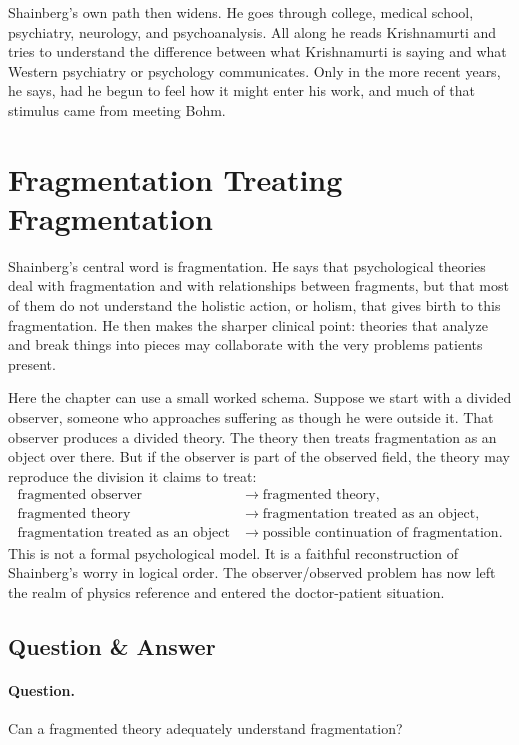 Shainberg's own path then widens. He goes through college, medical school, psychiatry, neurology, and psychoanalysis. All along he reads Krishnamurti and tries to understand the difference between what Krishnamurti is saying and what Western psychiatry or psychology communicates. Only in the more recent years, he says, had he begun to feel how it might enter his work, and much of that stimulus came from meeting Bohm.

\section{Fragmentation Treating Fragmentation}

Shainberg's central word is fragmentation. He says that psychological theories deal with fragmentation and with relationships between fragments, but that most of them do not understand the holistic action, or holism, that gives birth to this fragmentation. He then makes the sharper clinical point: theories that analyze and break things into pieces may collaborate with the very problems patients present.

Here the chapter can use a small worked schema. Suppose we start with a divided observer, someone who approaches suffering as though he were outside it. That observer produces a divided theory. The theory then treats fragmentation as an object over there. But if the observer is part of the observed field, the theory may reproduce the division it claims to treat:
\begin{align}
\text{fragmented observer}
&\longrightarrow
\text{fragmented theory},\\
\text{fragmented theory}
&\longrightarrow
\text{fragmentation treated as an object},\\
\text{fragmentation treated as an object}
&\longrightarrow
\text{possible continuation of fragmentation}.
\end{align}
This is not a formal psychological model. It is a faithful reconstruction of Shainberg's worry in logical order. The observer/observed problem has now left the realm of physics reference and entered the doctor-patient situation.

\subsection{Question \& Answer}

\paragraph{Question.}
Can a fragmented theory adequately understand fragmentation?

